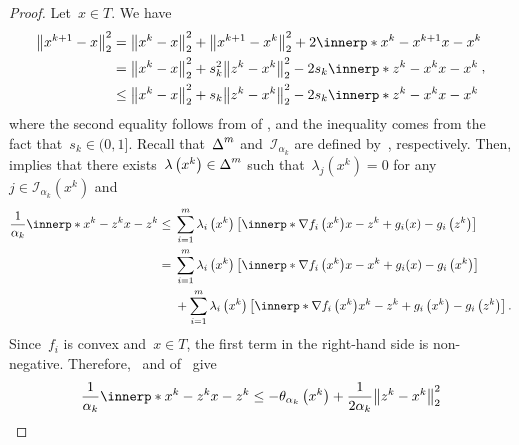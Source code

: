 \documentclass[../main]{subfiles}
\begin{document}
\begin{proof}
    Let~$x \in T$.
    We have
    \begin{equation} \label{eq:pgm_convergence:fejer_pre}
        \begin{aligned}
            \norm*{x^{k + 1} - x}_2^2 & = \norm*{x^k - x}_2^2 + \norm*{x^{k + 1} - x^k}_2^2 + 2 \innerp*{x^k - x^{k + 1}}{x - x^k} \\
                                      & = \norm*{x^k - x}_2^2 + s_k^2 \norm*{z^k - x^k}_2^2 - 2 s_k \innerp*{z^k - x^k}{x - x^k}   \\
                                      & \le \norm*{x^k - x}_2^2 + s_k \norm*{z^k - x^k}_2^2 - 2 s_k \innerp*{z^k - x^k}{x - x^k}
        \end{aligned}
        ,\end{equation}
    where the second equality follows from  of , and the inequality comes from the fact that~$s_k \in (0, 1]$.
    Recall that~$\operatorname{\Delta}^m$ and~$\mathcal{I}_{\alpha_k}$ are defined by~, respectively.
    Then,  implies that there exists~$\lambda\left(x^k\right) \in \operatorname{\Delta}^m$ such that~$\lambda_j\left(x^k\right) = 0$ for any~$j \in \mathcal{I}_{\alpha_k}\left(x^k\right)$ and
    \begin{align}
        \frac{1}{\alpha_k} \innerp*{x^k - z^k}{x - z^k} \le{} & \sum_{i = 1}^{m} \lambda_i\left(x^k\right) \left[ \innerp*{\nabla f_i\left(x^k\right)}{x - z^k} + g_i(x) - g_i\left(z^k\right) \right]                  \\
        ={}                                                   & \sum_{i = 1}^{m} \lambda_i\left(x^k\right) \left[ \innerp*{\nabla f_i\left(x^k\right)}{x - x^k} + g_i(x) - g_i\left(x^k\right) \right]                  \\
                                                              & + \sum_{i = 1}^{m} \lambda_i\left(x^k\right) \left[ \innerp*{\nabla f_i\left(x^k\right)}{x^k - z^k} + g_i\left(x^k\right) - g_i\left(z^k\right) \right]
        .\end{align}
    Since~$f_i$ is convex and~$x \in T$, the first term in the right-hand side is non-negative.
    Therefore,~ and  of~ give
    \begin{equation}
        \frac{1}{\alpha_k} \innerp*{x^k - z^k}{x - z^k} \le - \theta_{\alpha_k}\left(x^k\right) + \frac{1}{2 \alpha_k} \norm*{z^k - x^k}_2^2

\end{equation}
\end{proof}
\end{document}
